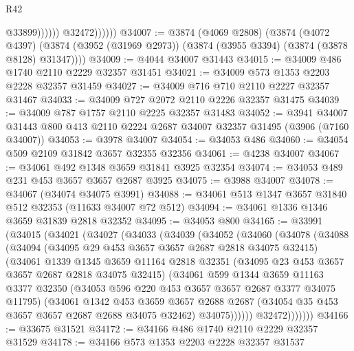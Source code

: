 \begin{lexlean}{R42}
\begin{coremodule}
                            @33899))))))
                @32472))))))
@34007 := @3874
    (@4069 @2808)
    (@3874
      (@4072 @4397)
      (@3874 (@3952 (@31969 @2973)) (@3874 (@3955 @3394) (@3874 (@3878 @8128) @31347))))
@34009 := @4044 @34007 @31443
@34015 := @34009 @486 @1740 @2110 @2229 @32357 @31451
@34021 := @34009 @573 @1353 @2203 @2228 @32357 @31459
@34027 := @34009 @716 @710 @2110 @2227 @32357 @31467
@34033 := @34009 @727 @2072 @2110 @2226 @32357 @31475
@34039 := @34009 @787 @1757 @2110 @2225 @32357 @31483
@34052 := @3941
    @34007
    @31443
    @800
    @413
    @2110
    @2224
    @2687
    @34007
    @32357
    @31495
    (@3906 (@7160 @34007))
@34053 := @3978 @34007
@34054 := @34053 @486
@34060 := @34054 @509 @2109 @31842 @3657 @32355 @32356
@34061 := @4238 @34007
@34067 := @34061 @492 @1348 @3659 @31841 @3925 @32354
@34074 := @34053 @489 @231 @453 @3657 @3657 @2687 @3925
@34075 := @3988 @34007
@34078 := @34067 (@34074 @34075 @3991)
@34088 := @34061 @513 @1347 @3657 @31840 @512 @32353 (@11633 @34007 @72 @512)
@34094 := @34061 @1336 @1346 @3659 @31839 @2818 @32352
@34095 := @34053 @800
@34165 := @33991
    (@34015
      (@34021
        (@34027
          (@34033
            (@34039
              (@34052
                (@34060
                  (@34078
                    (@34088
                      (@34094
                        (@34095 @29 @453 @3657 @3657 @2687 @2818 @34075 @32415)
                        (@34061
                          @1339
                          @1345
                          @3659
                          @11164
                          @2818
                          @32351
                          (@34095 @23 @453 @3657 @3657 @2687 @2818 @34075 @32415)
                          (@34061
                            @599
                            @1344
                            @3659
                            @11163
                            @3377
                            @32350
                            (@34053 @596 @220 @453 @3657 @3657 @2687 @3377 @34075 @11795)
                            (@34061
                              @1342
                              @453
                              @3659
                              @3657
                              @2688
                              @2687
                              (@34054 @35 @453 @3657 @3657 @2687 @2688 @34075 @32462)
                              @34075))))))
                  @32472)))))))
@34166 := @33675 @31521
@34172 := @34166 @486 @1740 @2110 @2229 @32357 @31529
@34178 := @34166 @573 @1353 @2203 @2228 @32357 @31537

\end{coremodule}
\end{lexlean}
